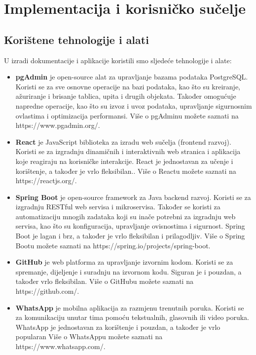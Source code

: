 \chapter{Implementacija i korisničko sučelje}
		
		
		\section{Korištene tehnologije i alati}
			
			U izradi dokumentacije i aplikacije koristili smo sljedeće tehnologije i alate:
			\begin{itemize}
			\item\textbf{pgAdmin} je open-source alat za upravljanje bazama podataka PostgreSQL. Koristi se za sve osnovne operacije na bazi podataka, kao što su kreiranje, ažuriranje i brisanje tablica, upita i drugih objekata. Također omogućuje napredne operacije, kao što su izvoz i uvoz podataka, upravljanje sigurnosnim ovlastima i optimizacija performansi. Više o pgAdminu možete saznati na https://www.pgadmin.org/.
			
			\item\textbf{React} je JavaScript biblioteka za izradu web sučelja (frontend razvoj). Koristi se za izgradnju dinamičnih i interaktivnih web stranica i aplikacija koje reagiraju na korisničke interakcije. React je jednostavan za učenje i korištenje, a također je vrlo fleksibilan.. Više o Reactu možete saznati na https://reactjs.org/.
			
			\item\textbf{Spring Boot} je open-source framework za Java backend razvoj. Koristi se za izgradnju RESTful web servisa i mikroservisa. Također se koristi za automatizaciju mnogih zadataka koji su inače potrebni za izgradnju web servisa, kao što su konfiguracija, upravljanje ovisnostima i sigurnost. Spring Boot je lagan i brz, a također je vrlo fleksibilan i prilagodljiv. Više o Spring Bootu možete saznati na https://spring.io/projects/spring-boot.
			
			\item\textbf{GitHub} je web platforma za upravljanje izvornim kodom. Koristi se za spremanje, dijeljenje i suradnju na izvornom kodu. Siguran je i pouzdan, a također vrlo fleksibilan.  Više o GitHubu možete saznati na https://github.com/.
			
			\item\textbf{WhatsApp} je mobilna aplikacija za razmjenu trenutnih poruka. Koristi se za komunikaciju unutar tima pomoću tekstualnih, glasovnih ili video poruka. WhatsApp je jednostavan za korištenje i pouzdan, a također je vrlo popularan Više o WhatsAppu možete saznati na https://www.whatsapp.com/.
			

\end{itemize}
